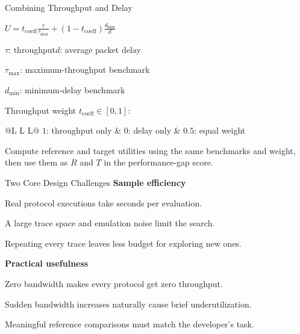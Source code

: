 \source{}
\begin{frame}[t]{Combining Throughput and Delay}
\bodyfont
\vspace{10pt}
{\fontsize{32}{40}\selectfont\centering
$\displaystyle U=t_{\mathrm{coeff}}\frac{\tau}{\tau_{\max}}
+(1-t_{\mathrm{coeff}})\frac{d_{\min}}{d}$\par}
\vspace{22pt}
{\compactfont
$\tau$: throughput\qquad $d$: average packet delay\par
\vspace{8pt}
$\tau_{\max}$: maximum-throughput benchmark\par
$d_{\min}$: minimum-delay benchmark\par}
\pause
\vspace{22pt}
Throughput weight $t_{\mathrm{coeff}}\in[0,1]$:\par
\vspace{12pt}
{\renewcommand{\arraystretch}{1.25}
\begin{tabularx}{\linewidth}{@{}L L L@{}}
\toprule
$1$: throughput only & $0$: delay only & $0.5$: equal weight\\
\bottomrule
\end{tabularx}\par}
\vspace{24pt}
Compute reference and target utilities using the same benchmarks and weight,\newline
then use them as $R$ and $T$ in the performance-gap score.
\end{frame}

\source{}
\begin{frame}[t]{Two Core Design Challenges}
\bodyfont
{\color{SemBlue}\textbf{Sample efficiency}}\par
\begin{points}
\item Real protocol executions take seconds per evaluation.
\item A large trace space and emulation noise limit the search.
\item Repeating every trace leaves less budget for exploring new ones.
\end{points}
\pause
\vspace{22pt}
{\color{SemBlue}\textbf{Practical usefulness}}\par
\begin{points}
\item Zero bandwidth makes every protocol get zero throughput.
\item Sudden bandwidth increases naturally cause brief underutilization.
\item Meaningful reference comparisons must match the developer's task.
\end{points}
\end{frame}
